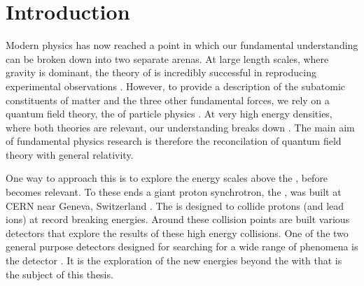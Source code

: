 \chapter{Introduction}
\label{chap:introduction}





Modern physics has now reached a point in which our fundamental
understanding can be broken down into two separate arenas. At large
length scales, where gravity is dominant, the theory of \GR
\cite{1914ZMP63215E} is incredibly successful in reproducing
experimental observations \cite{Will:2014kxa}.  However, to provide a
description of the subatomic constituents of matter and the three
other fundamental forces, we rely on a quantum field theory, the \SM
of particle physics
\cite{Salam:1964ry,Glashow:1961tr,PhysRevLett.19.1264}. At very high
energy densities, where both theories are relevant, our understanding
breaks down \cite{Weinberg:1980gg}. The main aim of fundamental
physics research is therefore the reconcilation of quantum field
theory with general relativity. 

One way to approach this is to explore the energy scales above the
\SM, before \GR becomes relevant. To these ends a giant proton
synchrotron, the \LHC, was built at CERN near Geneva, Switzerland
\cite{Evans:2008zzb}. The \LHC is designed to collide protons (and
lead ions) at record breaking energies. Around these collision points
are built various detectors that explore the results of these high
energy collisions. One of the two general purpose detectors designed
for searching for a wide range of phenomena is the \CMS detector
\cite{Chatrchyan:2008aa}. It is the exploration of the new energies
beyond the \SM with \CMS that is the subject of this thesis.

